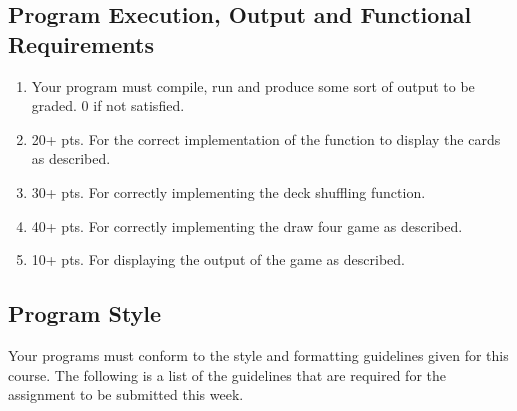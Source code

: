 \documentclass[11pt]{article}
\begin{document}
\subsection*{Program Execution, Output and Functional Requirements}
\label{sec-5-1}


\begin{enumerate}
\item Your program must compile, run and produce some sort of output to
   be graded. 0 if not satisfied.
\item 20+ pts. For the correct implementation of the function to display the
   cards as described.
\item 30+ pts. For correctly implementing the deck shuffling function.
\item 40+ pts. For correctly implementing the draw four game as described.
\item 10+ pts. For displaying the output of the game as described.
\end{enumerate}
\subsection*{Program Style}
\label{sec-5-2}


Your programs must conform to the style and formatting guidelines
given for this course.  The following is a list of the guidelines that
are required for the assignment to be submitted this week.
\end{document}
